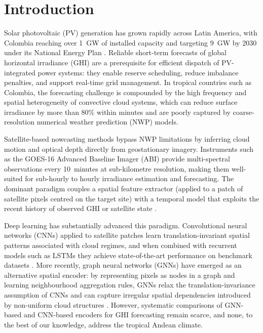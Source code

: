 \section{Introduction}
\label{sec:intro}

Solar photovoltaic (PV) generation has grown rapidly across Latin America, with
Colombia reaching over 1~GW of installed capacity and targeting 9~GW by 2030
under its National Energy Plan \cite{upme2023}. Reliable short-term forecasts of
global horizontal irradiance (GHI) are a prerequisite for efficient dispatch of
PV-integrated power systems: they enable reserve scheduling, reduce imbalance
penalties, and support real-time grid management. In tropical countries such as
Colombia, the forecasting challenge is compounded by the high frequency and spatial
heterogeneity of convective cloud systems, which can reduce surface irradiance by
more than 80\% within minutes and are poorly captured by coarse-resolution numerical
weather prediction (NWP) models.

Satellite-based nowcasting methods bypass NWP limitations by inferring cloud
motion and optical depth directly from geostationary imagery. Instruments such as
the GOES-16 Advanced Baseline Imager (ABI) provide multi-spectral observations
every 10~minutes at sub-kilometre resolution, making them well-suited for
sub-hourly to hourly irradiance estimation and forecasting. The dominant paradigm
couples a spatial feature extractor (applied to a patch of satellite pixels
centred on the target site) with a temporal model that exploits the recent
history of observed GHI or satellite state \cite{zhang2015,reno2016}.

Deep learning has substantially advanced this paradigm. Convolutional neural
networks (CNNs) applied to satellite patches learn translation-invariant spatial
patterns associated with cloud regimes, and when combined with recurrent models
such as LSTMs they achieve state-of-the-art performance on benchmark datasets
\cite{alessandrini2015,huertas2018,paletta2021}. More recently, graph neural networks
(GNNs) have emerged as an alternative spatial encoder: by representing pixels as
nodes in a graph and learning neighbourhood aggregation rules, GNNs relax the
translation-invariance assumption of CNNs and can capture irregular spatial
dependencies introduced by non-uniform cloud structures \cite{hamilton2017,ji2022}.
However, systematic comparisons of GNN-based and CNN-based encoders for GHI
forecasting remain scarce, and none, to the best of our knowledge, address the
tropical Andean climate.

